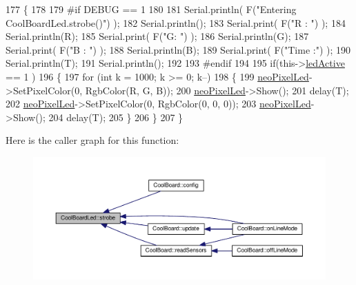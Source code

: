 \begin{DoxyCode}
177 \{
178 
179 \textcolor{preprocessor}{#if DEBUG == 1}
180 
181     Serial.println( F(\textcolor{stringliteral}{"Entering CoolBoardLed.strobe()"}) );
182     Serial.println();
183     Serial.print( F(\textcolor{stringliteral}{"R : "}) );
184     Serial.println(R);
185     Serial.print( F(\textcolor{stringliteral}{"G: "}) );
186     Serial.println(G);
187     Serial.print( F(\textcolor{stringliteral}{"B : "}) );
188     Serial.println(B);
189     Serial.print( F(\textcolor{stringliteral}{"Time :"}) );
190     Serial.println(T);
191     Serial.println();
192 
193 \textcolor{preprocessor}{#endif  }
194 
195     \textcolor{keywordflow}{if}(this->\hyperlink{classCoolBoardLed_a5f17c135516fcf4b44ea8a096ba0177a}{ledActive} == 1 )
196     \{   
197         \textcolor{keywordflow}{for} (\textcolor{keywordtype}{int} k = 1000; k >= 0; k--) 
198         \{
199             \hyperlink{classCoolBoardLed_ac2c13fa462a010cd9242bf297c013923}{neoPixelLed}->SetPixelColor(0, RgbColor(R, G, B));
200             \hyperlink{classCoolBoardLed_ac2c13fa462a010cd9242bf297c013923}{neoPixelLed}->Show();
201             delay(T);
202             \hyperlink{classCoolBoardLed_ac2c13fa462a010cd9242bf297c013923}{neoPixelLed}->SetPixelColor(0, RgbColor(0, 0, 0));
203             \hyperlink{classCoolBoardLed_ac2c13fa462a010cd9242bf297c013923}{neoPixelLed}->Show();
204             delay(T);
205         \}
206     \}
207 \}
\end{DoxyCode}
Here is the caller graph for this function\+:\nopagebreak
\begin{figure}[H]
\begin{center}
\leavevmode
\includegraphics[width=350pt]{classCoolBoardLed_ad5f0de4c628cbfbf49896042831c64ad_icgraph}
\end{center}
\end{figure}
\mbox{\label{classCoolBoardLed_a30fadd4cbec17ceea428bf7a32207e87}} 
